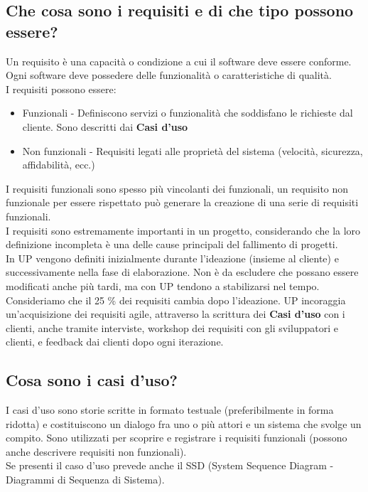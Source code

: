 \documentclass[12pt, a4paper, openany]{book}
\begin{document}
\subsection*{Che cosa sono i requisiti e di che tipo possono essere?}
Un requisito è una capacità o condizione a cui il software deve essere conforme. Ogni software
deve possedere delle funzionalità o caratteristiche di qualità.\\
I requisiti possono essere:
\begin{itemize}
    \item Funzionali - Definiscono servizi o funzionalità che soddisfano le richieste dal cliente. Sono
    descritti dai \textbf{Casi d'uso}
    \item Non funzionali - Requisiti legati alle proprietà  del sistema (velocità, sicurezza, affidabilità, ecc.)
\end{itemize}
I requisiti funzionali sono spesso più vincolanti dei funzionali, un requisito non funzionale per
essere rispettato può generare la creazione di una serie di requisiti funzionali.\\
I requisiti sono estremamente importanti in un progetto, considerando che la loro
definizione incompleta è una delle cause principali del fallimento di progetti.\\
In UP vengono definiti inizialmente durante l'ideazione (insieme al cliente) e successivamente
nella fase di elaborazione. Non è da escludere che possano essere modificati anche più tardi,
ma con UP tendono a stabilizarsi nel tempo. Consideriamo che il 25 \% dei requisiti cambia dopo
l'ideazione. UP incoraggia un'acquisizione dei requisiti agile, attraverso la scrittura 
dei \textbf{Casi d'uso} con i clienti, anche tramite interviste, workshop dei requisiti con gli sviluppatori
e clienti, e feedback dai clienti dopo ogni iterazione.

\subsection*{Cosa sono i casi d'uso?}
I casi d'uso sono storie scritte in formato testuale (preferibilmente in forma ridotta)
e costituiscono un dialogo fra uno o più attori e un sistema che svolge un compito. Sono
utilizzati per scoprire e registrare i requisiti funzionali (possono anche descrivere requisiti
non funzionali).\\
Se presenti il caso d'uso prevede anche il SSD (System Sequence Diagram - Diagrammi di Sequenza di Sistema).
\end{document}
